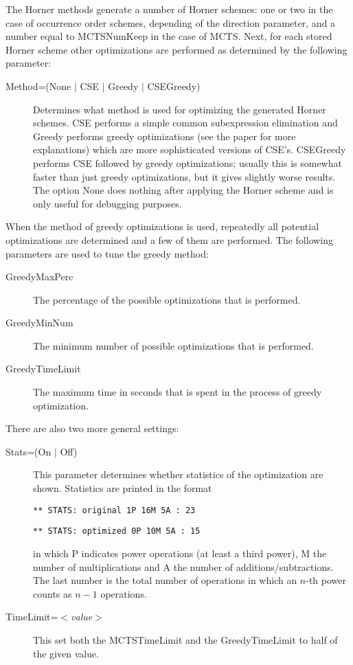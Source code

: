 The Horner methods generate a number of Horner schemes: one or two in
the case of occurrence order schemes, depending of the direction
parameter, and a number equal to MCTSNumKeep in the case of
MCTS. Next, for each stored Horner scheme other optimizations are
performed as determined by the following parameter:

\begin{description}
\item[Method=(None $|$ CSE $|$ Greedy $|$ CSEGreedy)] Determines what
method is used for optimizing the generated Horner schemes. 
CSE performs a simple 
common subexpression elimination and Greedy performs greedy 
optimizations (see the paper for more 
explanations) which are more sophisticated versions of CSE's. CSEGreedy 
performs CSE followed by greedy optimizations; usually this is somewhat 
faster than just greedy optimizations, but it gives slightly worse results. 
The option None does nothing after applying the Horner scheme and is only 
useful for debugging purposes.
\end{description}

When the method of greedy optimizations is used, repeatedly all
potential optimizations are determined and a few of them are performed. The 
following parameters are used to tune the greedy method:
\begin{description}
\item[GreedyMaxPerc] The percentage of the possible optimizations that is
  performed.
\item[GreedyMinNum] The minimum number of possible optimizations that
  is performed.
\item[GreedyTimeLimit] The maximum time in seconds that is spent in
  the process of greedy optimization.
\end{description}

There are also two more general settings:
\begin{description}
\item[Stats=(On $|$ Off)] This parameter determines whether statistics
  of the optimization are shown. Statistics are printed in the format

{\tt *** STATS: original  1P 16M 5A : 23}

{\tt *** STATS: optimized 0P 10M 5A : 15}

in which P indicates power operations (at least a third power), M the 
number of multiplications and A the number of additions/subtractions. The 
last number is the total number of operations in which an $n$-th power counts 
as $n-1$ operations.
\item[TimeLimit=$<$\emph{value}$>$] This set both the MCTSTimeLimit
  and the GreedyTimeLimit to half of the given value.
\end{description}

